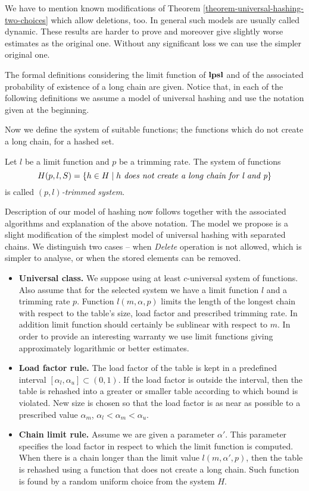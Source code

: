 \documentclass[runningheads,a4paper]{llncs}
\begin{document}
We have to mention known modifications of Theorem \ref{theorem-universal-hashing-two-choices} which allow deletions, too. In general such models are usually called dynamic. These results are harder to prove and moreover give slightly worse estimates as the original one. Without any significant loss we can use the simpler original one.

The formal definitions considering the limit function of $\mathbf{lpsl}$ and of the associated probability of existence of a long chain are given. Notice that, in each of the following definitions we assume a model of universal hashing and use the notation given at the beginning.

Now we define the system of suitable functions; the functions which do not create a long chain, for a hashed set.
\begin{definition}
Let $l$ be a limit function and $p$ be a trimming rate. The system of functions \[ H(p, l, S) = \{ h \in H \mid h \textit{ does not create a long chain for l and p} \} \] is called \emph{$(p, l)$-trimmed system}.
\end{definition}

Description of our model of hashing now follows together with the associated algorithms and explanation of the above notation. The model we propose is a slight modification of the simplest model of universal hashing with separated chains. We distinguish two cases -- when \emph{Delete} operation is not allowed, which is simpler to analyse, or when the stored elements can be removed.

\begin{itemize}
\item \textbf{Universal class.} We suppose using at least $c$-universal system of functions. Also assume that for the selected system we have a limit function $l$ and a trimming rate $p$. Function $l(m, \alpha, p)$ limits the length of the longest chain with respect to the table's size, load factor and prescribed trimming rate. In addition limit function should certainly be sublinear with respect to $m$. In order to provide an interesting warranty we use limit functions giving approximately logarithmic or better estimates.

\item \textbf{Load factor rule.} The load factor of the table is kept in a predefined interval $[\alpha_l, \alpha_u] \subset (0, 1)$. If the load factor is outside the interval, then the table is rehashed into a greater or smaller table according to which bound is violated. New size is chosen so that the load factor is as near as possible to a prescribed value $\alpha_m$, $\alpha_l < \alpha_m < \alpha_u$. 

\item \textbf{Chain limit rule.} Assume we are given a parameter $\alpha'$. This parameter specifies the load factor in respect to which the limit function is computed. When there is a chain longer than the limit value $l(m, \alpha', p)$, then the table is rehashed using a function that does not create a long chain. Such function is found by a random uniform choice from the system $H$.
\end{itemize}
\end{document}
